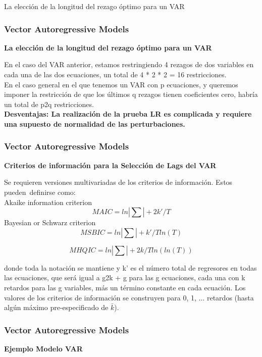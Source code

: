 \documentclass[spanish,xcolor=table]{beamer}
\begin{document}
\begin{section}{La elecci\'on de la longitud del rezago \'optimo para un VAR}
\begin{frame}
\end{frame}
\begin{frame}
\frametitle{Vector Autoregressive Models}
\textbf{La elecci\'on de la longitud del rezago \'optimo para un VAR}

En el caso del VAR anterior, estamos restringiendo 4 rezagos de dos variables en cada una de las dos ecuaciones, un total de 4 * 2 * 2 = 16 restricciones.\\
En el caso general en el que tenemos un VAR con p ecuaciones, y queremos imponer la restricci\'on de que los \'ultimos q rezagos tienen coeficientes cero,  habría un total de p2q restricciones.\\
\textbf{Desventajas: La realizaci\'on de la prueba LR es complicada y requiere una supuesto de normalidad de las perturbaciones.}

\end{frame}
\begin{frame}
\frametitle{Vector Autoregressive Models}

\textbf{Criterios de informaci\'on para la Selecci\'on de Lags del VAR}

Se requieren versiones multivariadas de los criterios de informaci\'on. Estos pueden definirse como:\\
Akaike information criterion
\begin{equation*}
MAIC = ln |\sum| + 2k'/T 
\end{equation*}
Bayesian or Schwarz criterion
\begin{equation*}
MSBIC = ln |\sum| + k'/T ln(T) 
\end{equation*}

\begin{equation*}
MHQIC = ln |\sum| + 2k/T ln(ln(T))
\end{equation*}

donde toda la notaci\'on se mantiene y k' es el n\'umero total de regresores en todas las ecuaciones, que ser\'a igual a g2k + g para las g ecuaciones, cada una con k retardos para las g variables, m\'as un t\'ermino constante en cada ecuaci\'on. Los valores de los criterios de informaci\'on se construyen para 0, 1, $\dots{}$ retardos (hasta alg\'un m\'aximo pre-especificado de $\bar{k}$).

\end{frame}
\begin{frame}
\frametitle{Vector Autoregressive Models}
\textbf{Ejemplo Modelo VAR}


\end{frame}
\end{section}
\end{document}
